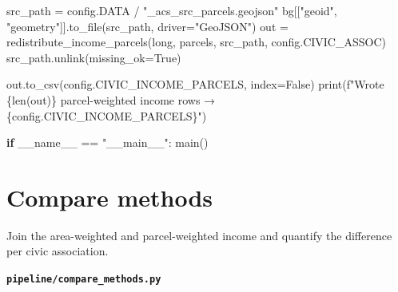 \documentclass[
  letterpaper,
  DIV=11,
  numbers=noendperiod]{scrreprt}
\newenvironment{Shaded}{\begin{snugshade}}{\end{snugshade}}
\newcommand{\BuiltInTok}[1]{\textcolor[rgb]{0.00,0.23,0.31}{#1}}
\newcommand{\ControlFlowTok}[1]{\textcolor[rgb]{0.00,0.23,0.31}{\textbf{#1}}}
\newcommand{\NormalTok}[1]{\textcolor[rgb]{0.00,0.23,0.31}{#1}}
\newcommand{\OperatorTok}[1]{\textcolor[rgb]{0.37,0.37,0.37}{#1}}
\newcommand{\SpecialCharTok}[1]{\textcolor[rgb]{0.37,0.37,0.37}{#1}}
\newcommand{\SpecialStringTok}[1]{\textcolor[rgb]{0.13,0.47,0.30}{#1}}
\newcommand{\StringTok}[1]{\textcolor[rgb]{0.13,0.47,0.30}{#1}}
\newcommand{\VariableTok}[1]{\textcolor[rgb]{0.07,0.07,0.07}{#1}}
\begin{document}
\begin{Shaded}
\begin{Highlighting}[]
\NormalTok{    src\_path }\OperatorTok{=}\NormalTok{ config.DATA }\OperatorTok{/} \StringTok{"\_acs\_src\_parcels.geojson"}
\NormalTok{    bg[[}\StringTok{"geoid"}\NormalTok{, }\StringTok{"geometry"}\NormalTok{]].to\_file(src\_path, driver}\OperatorTok{=}\StringTok{"GeoJSON"}\NormalTok{)}
\NormalTok{    out }\OperatorTok{=}\NormalTok{ redistribute\_income\_parcels(}\BuiltInTok{long}\NormalTok{, parcels, src\_path, config.CIVIC\_ASSOC)}
\NormalTok{    src\_path.unlink(missing\_ok}\OperatorTok{=}\VariableTok{True}\NormalTok{)}

\NormalTok{    out.to\_csv(config.CIVIC\_INCOME\_PARCELS, index}\OperatorTok{=}\VariableTok{False}\NormalTok{)}
    \BuiltInTok{print}\NormalTok{(}\SpecialStringTok{f"Wrote }\SpecialCharTok{\{}\BuiltInTok{len}\NormalTok{(out)}\SpecialCharTok{\}}\SpecialStringTok{ parcel{-}weighted income rows → }\SpecialCharTok{\{}\NormalTok{config}\SpecialCharTok{.}\NormalTok{CIVIC\_INCOME\_PARCELS}\SpecialCharTok{\}}\SpecialStringTok{"}\NormalTok{)}


\ControlFlowTok{if} \VariableTok{\_\_name\_\_} \OperatorTok{==} \StringTok{"\_\_main\_\_"}\NormalTok{:}
\NormalTok{    main()}
\end{Highlighting}
\end{Shaded}

\section{Compare methods}\label{compare-methods}

Join the area-weighted and parcel-weighted income and quantify the
difference per civic association.

\textbf{\texttt{pipeline/compare\_methods.py}}
\end{document}
